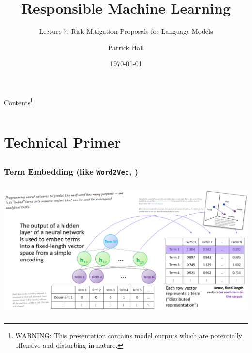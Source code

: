 \documentclass[11pt,
               aspectratio=169,
               hyperref={colorlinks}
               ]{beamer}
\author{Patrick Hall}
\title{Responsible Machine Learning}
\subtitle{Lecture 7: Risk Mitigation Proposals for Language Models}
\institute{The George Washington University}
\date{\today}
\begin{document}
	
	\maketitle
	
	\begin{frame}{Contents\footnote{\tiny{WARNING: This presentation contains model outputs which are potentially offensive and disturbing in nature.}}}

	\begin{columns}[onlytextwidth]
		\tableofcontents[sections = 1-8]
		\tableofcontents[sections = 9-17]
	\end{columns}

	\end{frame}


	\section{Technical Primer}
		\subsection*{} %
		
		\begin{frame}
			\frametitle{Term Embedding (like \texttt{Word2Vec}, \cite{NIPS2013_9aa42b31})}
			\centering
			\includegraphics[height=200pt]{../img/embed.png}
		\end{frame}
		
\end{document}

